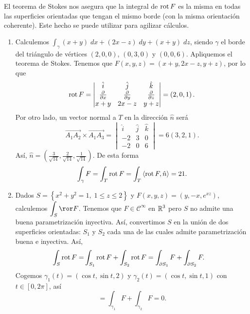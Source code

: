 \begin{observation}
El teorema de Stokes nos asegura que la integral de $\displaystyle \operatorname{rot} F $ es la misma en todas las superficies orientadas que tengan el mismo borde (con la misma orientación coherente). Este hecho se puede utilizar para agilizar cálculos.
\end{observation}
\begin{eg}
\begin{enumerate}
\item Calculemos $\displaystyle \int _{\gamma }\left(x+y\right) \; dx + \left(2x-z\right)\; dy + \left(x + y \right)\; dz $, siendo $\displaystyle \gamma  $ el borde del triángulo de vértices $\displaystyle \left(2,0,0\right) $, $\displaystyle \left(0,3,0\right) $ y $\displaystyle \left(0,0,6\right) $. Apliquemos el teorema de Stokes. Tenemos que $\displaystyle F\left(x,y,z\right)=\left(x + y, 2x-z, y + z\right) $, por lo que 
	\[\operatorname{rot} F=\begin{vmatrix} \hat{i} & \hat{j} & \hat{k} \\ \frac{\partial }{\partial x} & \frac{\partial }{\partial y} & \frac{\partial }{\partial z} \\ x + y & 2x-z & y + z \end{vmatrix} =\left(2,0,1\right) .\]
	Por otro lado, un vector normal a $\displaystyle T $ en la dirección $\displaystyle \hat{n} $ será
	\[\overrightarrow{A_{1}A_{2}}\times \overrightarrow{A_{1}A_{3}}=\begin{vmatrix} \hat{i} & \hat{j} & \hat{k} \\ - 2 & 3 & 0 \\ - 2 & 0 & 6 \end{vmatrix} =6\left(3, 2, 1\right) .\]
	Así, $\displaystyle \hat{n}=\left(\frac{3}{\sqrt{14}}, \frac{2}{\sqrt{14}}, \frac{1}{\sqrt{14}}\right) $. De esta forma
	\[\int _{\gamma }F = \int _{T}\operatorname{rot} F = \int _{T}\left\langle \operatorname{rot} F, \hat{n} \right\rangle  =21 .\]
\item Dados $\displaystyle S = \left\{ x^{2}+y^{2}=1, \; 1 \leq z \leq 2\right\}  $ y $\displaystyle F \left(x,y,z\right)=\left(y, - x, e^{xz}\right) $, calculemos $\displaystyle \int _{S}\ror F  $. Tenemos que $\displaystyle F \in \mathcal{C}^{\infty} $ en $\displaystyle \mathbb{R}^{3} $ pero $\displaystyle S $ no admite una buena parametrización inyectiva. Así, convertimos $\displaystyle S $ en la unión de dos superficies orientadas: $\displaystyle S_{1} $ y $\displaystyle S_{2} $ cada una de las cuales admite parametrización buena e inyectiva. 
	Así, 
	\[
	\begin{split}
		\int _{S}\operatorname{rot} F = & \int _{S_{1}}\operatorname{rot} F +\int _{S_{2}}\operatorname{rot} F = \int _{\partial S_{1}}F +\int _{\partial S_{2}}F  .
	\end{split}
	\]
	Cogemos $\displaystyle \gamma_{1}\left(t\right)=\left(\cos t, \sin t, 2\right) $ y $\displaystyle \gamma_{2}\left(t\right)=\left(\cos t, \sin t, 1\right) $ con $\displaystyle t \in \left[0, 2\pi \right]  $, así
	\[=\int _{\gamma_{1}}F +\int _{\gamma_{2}}F =0 .\]
\end{enumerate}
\end{eg}
